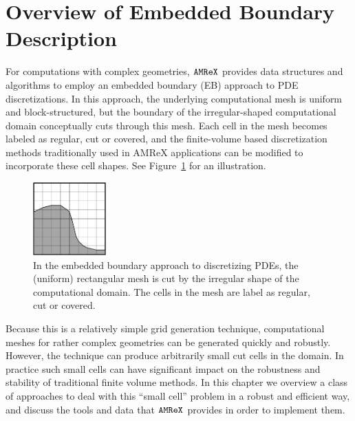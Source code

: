 \newcommand{\xbold}{{\bf x}}
\newcommand{\ibold}{{\bf i}}
\newcommand{\jbold}{{\bf j}}
\newcommand{\kbold}{{\bf k}}
\newcommand{\nbold}{{\bf k}}
\newcommand{\cbold}{{\bf k}}
\newcommand{\ebis}{{\tt EBIndexSpace}}
\newcommand{\baseif}{{\tt BaseIF}}
\newcommand{\sphereif}{{\tt SphereIF}}
\newcommand{\transformif}{{\tt TransformIF}}
\newcommand{\latheif}{{\tt LatheIF}}
\newcommand{\unionif}{{\tt UnionIF}}
\newcommand{\intersectionif}{{\tt IntersectionIF}}
\newcommand{\geom}{{\tt GeometryShop}}
\newcommand{\parm}{{\tt ParmParse}}

\section{Overview of Embedded Boundary Description}
\label{sec:EB:EBOverview}

For computations with complex geometries, $\tt{AMReX}$ provides data
structures and algorithms to employ an embedded boundary (EB) approach to
PDE discretizations.    In this approach, the underlying computational
mesh is uniform and block-structured, but the boundary of the irregular-shaped
computational domain conceptually cuts through this mesh.  Each cell in the mesh
becomes labeled as regular, cut or covered, and the finite-volume based
discretization methods traditionally used in AMReX applications can be
modified to incorporate these cell shapes.  See Figure~\ref{fig::ebexample}
for an illustration.
\begin{figure}[h]
  \centering
  \includegraphics[width=0.25\textwidth]{./EB/EB_example.pdf}
  \caption{\label{fig::ebexample}In the embedded boundary approach to
    discretizing PDEs, the (uniform) rectangular mesh is cut by the
    irregular shape of the computational domain.  The cells in the
    mesh are label as regular, cut or covered.}
\end{figure}
Because this is a relatively simple grid
generation technique, computational meshes for rather complex geometries
can be generated quickly and robustly.  However, the technique 
can produce arbitrarily small cut cells in the domain.  In practice such small
cells can have significant impact on the robustness and stability of
traditional finite volume methods.  In this chapter we overview
a class of approaches to deal with this ``small cell'' problem in a
robust and efficient way, and discuss the tools and data that $\tt{AMReX}$
provides in order to implement them.  

